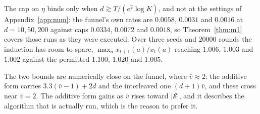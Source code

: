 \documentclass{article}
\theoremstyle{remark}
\newcommand{\Sset}{\mathcal{S}}
\begin{document}
The cap on $\eta$ binds only when $d\gtrsim T/(e^2\log K)$, and not at the settings of
Appendix~\ref{app:num}: the funnel's own rates are $0.0058$, $0.0031$ and $0.0016$ at
$d=10,50,200$ against caps $0.0334$, $0.0072$ and $0.0018$, so Theorem~\ref{thm:m1} covers those
runs as they were executed. Over three seeds and $20000$ rounds the induction has room to spare,
$\max_ax_{t+1}(a)/x_t(a)$ reaching $1.006$, $1.003$ and $1.002$ against the permitted $1.100$,
$1.020$ and $1.005$.

The two bounds are numerically close on the funnel, where $\bar v\approx2$: the additive form
carries $3.3(\bar v-1)+2d$ and the interleaved one $(d+1)\bar v$, and these cross near $\bar v=2$.
The additive form gains as $\bar v$ rises toward $|\Sset|$, and it describes the algorithm that is
actually run, which is the reason to prefer it.
\end{document}
